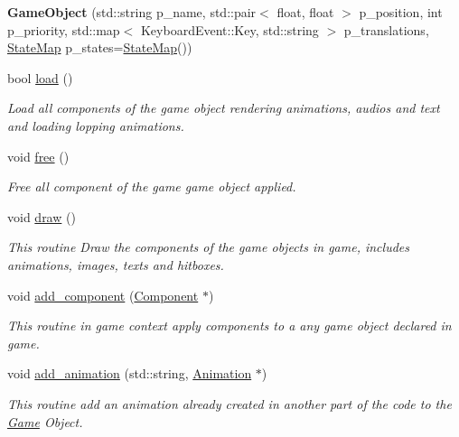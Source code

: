 \begin{DoxyCompactItemize}
\item 
{\bfseries Game\+Object} (std\+::string p\+\_\+name, std\+::pair$<$ float, float $>$ p\+\_\+position, int p\+\_\+priority, std\+::map$<$ Keyboard\+Event\+::\+Key, std\+::string $>$ p\+\_\+translations, \hyperlink{classengine_1_1_state_map}{State\+Map} p\+\_\+states=\hyperlink{classengine_1_1_state_map}{State\+Map}())\hypertarget{classengine_1_1_game_object_a59a216d31883f3acdc8f53b2f316aaa3}{}\label{classengine_1_1_game_object_a59a216d31883f3acdc8f53b2f316aaa3}

\item 
bool \hyperlink{classengine_1_1_game_object_ab6289ed26a76a17506ffb26869904844}{load} ()
\begin{DoxyCompactList}\small\item\em Load all components of the game object rendering animations, audios and text and loading lopping animations. \end{DoxyCompactList}\item 
void \hyperlink{classengine_1_1_game_object_ab4ab356f4d4499ac1edac37f9932056c}{free} ()
\begin{DoxyCompactList}\small\item\em Free all component of the game game object applied. \end{DoxyCompactList}\item 
void \hyperlink{classengine_1_1_game_object_abb64143e72358beb808db22182517802}{draw} ()
\begin{DoxyCompactList}\small\item\em This routine Draw the components of the game objects in game, includes animations, images, texts and hitboxes. \end{DoxyCompactList}\item 
void \hyperlink{classengine_1_1_game_object_a22d54d2fd7ef478eda303b975c760b0e}{add\+\_\+component} (\hyperlink{classengine_1_1_component}{Component} $\ast$)
\begin{DoxyCompactList}\small\item\em This routine in game context apply components to a any game object declared in game. \end{DoxyCompactList}\item 
void \hyperlink{classengine_1_1_game_object_ab2d993b4a7670e2ed3ffb5d3f681d5ec}{add\+\_\+animation} (std\+::string, \hyperlink{classengine_1_1_animation}{Animation} $\ast$)
\begin{DoxyCompactList}\small\item\em This routine add an animation already created in another part of the code to the \hyperlink{classengine_1_1_game}{Game} Object. \end{DoxyCompactList}\item 

\end{DoxyCompactItemize}
